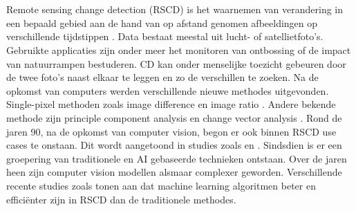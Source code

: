
\section{}%
\label{sec:remote-sensing-change-detection}

Remote sensing change detection (RSCD) is het waarnemen van verandering in een bepaald gebied aan de hand van op afstand genomen afbeeldingen op
verschillende tijdstippen \autocite{SINGH_1989}. Data bestaat meestal uit lucht- of satellietfoto’s. Gebruikte applicaties zijn onder meer het 
monitoren van ontbossing of de impact van natuurrampen bestuderen.
\newline
CD kan onder menselijke toezicht gebeuren door de twee foto's naast elkaar te leggen en zo de verschillen te zoeken. 
Na de opkomst van computers werden verschillende nieuwe methodes uitgevonden. Single-pixel methoden zoals image difference \autocite{QUARMBY_1989} 
en image ratio \autocite{HOWARTH_1981}. Andere bekende methode zijn principle component analysis \autocite{Deng_2008} en change vector analysis \autocite{Carvalho_J_nior_2011}. 
Rond de jaren 90, na de opkomst van computer vision, begon er ook binnen RSCD use cases te onstaan. Dit wordt aangetoond in studies zoals
\textcite{levien1999machine} en \textcite{dai1999remotely}. 
Sindsdien is er een groepering van traditionele en AI gebaseerde technieken ontstaan. Over de jaren heen zijn computer vision 
modellen alsmaar complexer geworden. Verschillende recente studies zoals \textcite{zerrouki2019machine} tonen aan dat machine learning algoritmen 
beter en efficiënter zijn in RSCD dan de traditionele methodes. 
\newline
\newline


